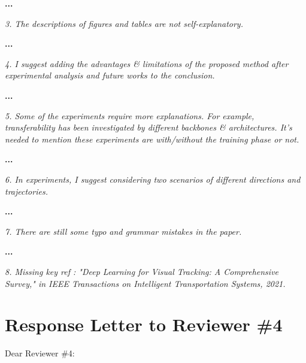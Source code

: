 \documentclass[12pt]{article}
\begin{document}
\textbf{...}

\textit{3. The descriptions of figures and tables are not self-explanatory.}

\textbf{...}

\textit{4. I suggest adding the advantages \& limitations of the proposed method after experimental analysis and future works to the conclusion.}

\textbf{...}

\textit{5. Some of the experiments require more explanations. For example, transferability has been investigated by different backbones \& architectures. It's needed to mention these experiments are with/without the training phase or not.}

\textbf{...}

\textit{6. In experiments, I suggest considering two scenarios of different directions and trajectories.}

\textbf{...}

\textit{7. There are still some typo and grammar mistakes in the paper.}

\textbf{...}

\textit{8. Missing key ref : "Deep Learning for Visual Tracking: A Comprehensive Survey," in IEEE Transactions on Intelligent Transportation Systems, 2021.}

\clearpage
\newpage
{\centering\section*{Response Letter to Reviewer \#4}}
\noindent Dear Reviewer \#4:
\end{document}
